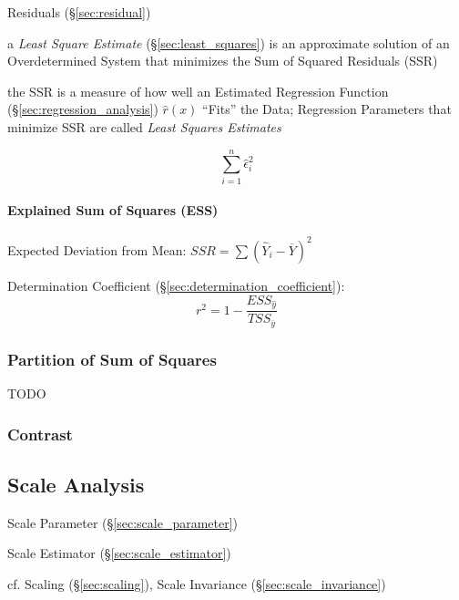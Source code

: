 Residuals (\S\ref{sec:residual})

\fist a \emph{Least Square Estimate} (\S\ref{sec:least_squares}) is an
approximate solution of an Overdetermined System that minimizes the Sum of
Squared Residuals (SSR)

the SSR is a measure of how well an Estimated Regression Function
(\S\ref{sec:regression_analysis}) $\hat{r}(x)$ ``Fits'' the Data; Regression
Parameters that minimize SSR are called \emph{Least Squares Estimates}

\[
  \sum_{i=1}^n \hat{\epsilon}_i^2
\]



\paragraph{Explained Sum of Squares (ESS)}\label{sec:ess}\hfill

Expected Deviation from Mean: $SSR = \sum(\hat{Y}_i - \overline{Y})^2$

Determination Coefficient (\S\ref{sec:determination_coefficient}):
\[
  r^2 = 1 - \frac{
    ESS_{\hat{y}}
  }{
    TSS_{\overline{y}}
  }
\]



\subsubsection{Partition of Sum of Squares}\label{sec:partition_squares}

TODO



\subsubsection{Contrast}\label{sec:contrast}



\subsection{Scale Analysis}\label{sec:statistical_scale}

Scale Parameter (\S\ref{sec:scale_parameter})

Scale Estimator (\S\ref{sec:scale_estimator})

cf. Scaling (\S\ref{sec:scaling}), Scale Invariance
(\S\ref{sec:scale_invariance})

